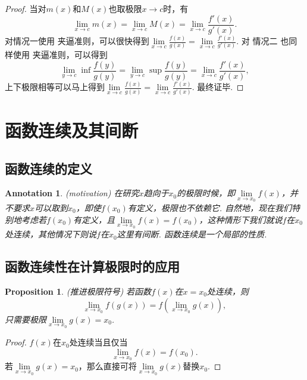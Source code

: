\documentclass{article}
\newtheorem{proposition}[theorem]{Proposition}
\newtheorem{annotation}[theorem]{Annotation}
\begin{document}
\begin{proof}
当对$m(x)$和$M(x)$也取极限$x \rightarrow c$时，有
$$
\lim\limits_{x \rightarrow c} m(x) = \lim\limits_{x \rightarrow c} M(x) = \lim\limits_{x \rightarrow c} \frac{f'(x)}{g'(x)}.
$$
对{\color{blue}情况一}使用{\color{red} 夹逼准则}，可以很快得到$\lim\limits_{x \rightarrow c} \frac{f(x)}{g(x)} = \lim\limits_{x \rightarrow c} \frac{f'(x)}{g'(x)}$. 对{\color{blue} 情况二 }也同样使用{\color{red} 夹逼准则}，可以得到
$$
\lim\limits_{y \rightarrow c }\inf\frac{f(y)}{g(y)} = \lim\limits_{y \rightarrow c }\sup\frac{f(y)}{g(y)} = \lim\limits_{x \rightarrow c} \frac{f'(x)}{g'(x)},
$$
上下极限相等可以马上得到$\lim\limits_{x \rightarrow c} \frac{f(x)}{g(x)} = \lim\limits_{x \rightarrow c} \frac{f'(x)}{g'(x)}$. 最终证毕.
\end{proof}

\newpage
\section{函数连续及其间断}

\subsection{函数连续的定义}

\begin{annotation}
\rm {\color{red} (motivation)} 在研究$x$趋向于$x_0$的极限时候，即$\lim\limits_{x \rightarrow x_0} f(x)$，并不要求$x$可以取到$x_0$，即使$f(x_0)$有定义，极限也不依赖它. 自然地，现在我们特别地考虑若$f(x_0)$有定义，且$\lim\limits_{x \rightarrow x_0}f(x) = f(x_0)$，这种情形下我们就说$f$在$x_0$处{\color{red}连续}，其他情况下则说$f$在$x_0$这里有{\color{red}间断}. {\color{blue} 函数连续是一个局部的性质}.
\end{annotation}


\subsection{函数连续性在计算极限时的应用}

\begin{proposition}
\rm {\color{red} (推进极限符号)} 若函数$f(x)$在$x = x_0$处连续，则
$$
\lim\limits_{x \rightarrow x_0} f(g(x)) = f(\lim\limits_{x \rightarrow x_0}g(x)),
$$
只需要极限$\lim\limits_{x \rightarrow x_0}g(x) = x_0$.
\end{proposition}

\begin{proof}
\rm $f(x)$在$x_0$处连续当且仅当
$$
\lim\limits_{x \rightarrow x_0}f(x) = f(x_0). 
$$
若$\lim\limits_{x \rightarrow x_0}g(x) = x_0$，那么直接可将$\lim\limits_{x \rightarrow x_0}g(x)$替换$x_0$. 
\end{proof}
\end{document}
